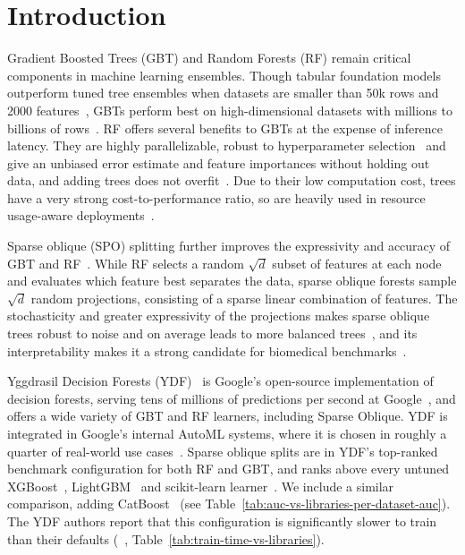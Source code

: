 \documentclass[sigconf]{acmart}%
\begin{document}



\section{Introduction}

Gradient Boosted Trees (GBT) and Random Forests (RF) remain critical components in machine learning ensembles. Though tabular foundation models outperform tuned tree ensembles when datasets are smaller than 50k rows and 2000 features~\cite{hollmann_accurate_2025,qu2026tabiclv2,grinsztajn2026tabpfn,tabarena,kong2026tabfm}, GBTs perform best on high-dimensional datasets with millions to billions of rows~\cite{ye2026closer}. RF offers several benefits to GBTs at the expense of inference latency. They are highly parallelizable, robust to hyperparameter selection~\cite{probst2019tunability} and give an unbiased error estimate and feature importances without holding out data, and adding trees does not overfit~\cite{breiman}. Due to their low computation cost, trees have a very strong cost-to-performance ratio, so are heavily used in resource usage-aware deployments~\cite{maier2026hapens}.

Sparse oblique (SPO) splitting further improves the expressivity and accuracy of GBT and RF~\cite{tomita2020sparse}. While RF selects a random $\sqrt{d}$ subset of features at each node and evaluates which feature best separates the data, sparse oblique forests sample $\sqrt{d}$ random projections, consisting of a sparse linear combination of features. The stochasticity and greater expressivity of the projections makes sparse oblique trees robust to noise and on average leads to more balanced trees~\cite{tomita2020sparse}, and its interpretability makes it a strong candidate for biomedical benchmarks~\cite{might2}.

Yggdrasil Decision Forests (YDF)~\cite{ydf} is Google's open-source implementation of decision forests, serving tens of millions of predictions per second at Google~\cite{ydf}, and offers a wide variety of GBT and RF learners, including Sparse Oblique. YDF is integrated in Google's internal AutoML systems, where it is chosen in roughly a quarter of real-world use cases~\cite{ydf}. Sparse oblique splits are in YDF's top-ranked benchmark configuration for both RF and GBT, and ranks above every untuned XGBoost~\cite{chen2016xgboost}, LightGBM~\cite{ke2017lightgbm} and scikit-learn learner~\cite{pedregosa2011scikit}. We include a similar comparison, adding CatBoost~\cite{prokhorenkova2018catboost} (see Table~\ref{tab:auc-vs-libraries-per-dataset-auc}). The YDF authors report that this configuration is significantly slower to train than their defaults (~\cite{ydf}, Table~\ref{tab:train-time-vs-libraries}). 
\end{document}
